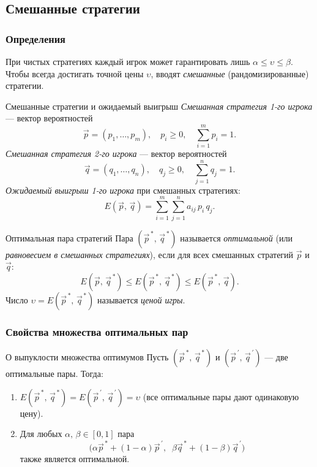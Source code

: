 \subsection{Смешанные стратегии}

\subsubsection*{Определения}

При чистых стратегиях каждый игрок может гарантировать лишь $\alpha \leq \upsilon \leq \beta$. Чтобы всегда достигать точной цены $\upsilon$, вводят \emph{смешанные} (рандомизированные) стратегии.

\begin{Definition}{Смешанные стратегии и ожидаемый выигрыш}{}
	\emph{Смешанная стратегия 1-го игрока} --- вектор вероятностей
	\[
	\vec{p} = (p_1, \ldots, p_m), \quad p_i \geq 0, \quad \sum_{i=1}^m p_i = 1.
	\]
	\emph{Смешанная стратегия 2-го игрока} --- вектор вероятностей
	\[
	\vec{q} = (q_1, \ldots, q_n), \quad q_j \geq 0, \quad \sum_{j=1}^n q_j = 1.
	\]
	\emph{Ожидаемый выигрыш 1-го игрока} при смешанных стратегиях:
	\[
	E(\vec{p},\,\vec{q}) = \sum_{i=1}^{m}\sum_{j=1}^{n} a_{ij}\, p_i\, q_j.
	\]
\end{Definition}

\begin{Definition}{Оптимальная пара стратегий}{}
	Пара $(\vec{p}^{\,*},\, \vec{q}^{\,*})$ называется \emph{оптимальной} (или \emph{равновесием в смешанных стратегиях}), если для всех смешанных стратегий $\vec{p}$ и $\vec{q}$:
	\[
	E(\vec{p},\, \vec{q}^{\,*}) \leq E(\vec{p}^{\,*},\, \vec{q}^{\,*}) \leq E(\vec{p}^{\,*},\, \vec{q}).
	\]
	Число $\upsilon = E(\vec{p}^{\,*},\, \vec{q}^{\,*})$ называется \emph{ценой игры}.
\end{Definition}

\subsubsection*{Свойства множества оптимальных пар}

\begin{Statement}{О выпуклости множества оптимумов}{}
	Пусть $(\vec{p}^{\,*},\, \vec{q}^{\,*})$ и $(\vec{p}^{\,\prime},\, \vec{q}^{\,\prime})$ --- две оптимальные пары. Тогда:
	\begin{enumerate}
		\item $E(\vec{p}^{\,*},\, \vec{q}^{\,*}) = E(\vec{p}^{\,\prime},\, \vec{q}^{\,\prime}) = \upsilon$ (все оптимальные пары дают одинаковую цену).
		\item Для любых $\alpha,\, \beta \in [0,1]$ пара
		\[
		\bigl(\alpha\vec{p}^{\,*} + (1-\alpha)\vec{p}^{\,\prime},\;\; \beta\vec{q}^{\,*} + (1-\beta)\vec{q}^{\,\prime}\bigr)
		\]
		также является оптимальной.
	\end{enumerate}
\end{Statement}

